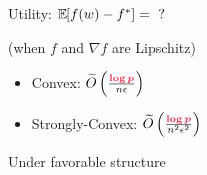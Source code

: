 \documentclass{beamer}
\begin{document}
















\begin{frame}
  \vspace{1em}
  \Huge
  Utility: $\mathbb E_{} \hspace{-0.29em} \left[ f(w) - f^* \right] = \text{ ?}$

  \vspace{0.5em}
  {
    \begin{center}
      \huge   (when $f$ and $\nabla f$ are Lipschitz)
    \end{center}
  }

  \pause

  \vspace{1em}
  \begin{itemize}
  \item Convex: $\widetilde O\left( \frac{\emphcol{\log{p}}}{n\epsilon} \right)$
  \item Strongly-Convex:  $\widetilde O\left( \frac{\emphcol{\log{p}}}{n^2\epsilon^2} \right)$
  \end{itemize}

  \vspace{.5em}
  \begin{center}
    \huge
    Under favorable structure
  \end{center}

\end{frame}
\end{document}
